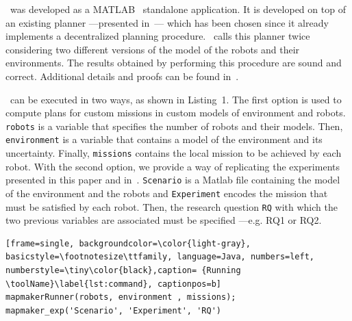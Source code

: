 
\toolName\  was developed as a  MATLAB~\cite{matlab} standalone application.
It is developed on top of an existing planner ---presented in~\cite{tumova2016multi}--- which has been chosen since it already implements a decentralized planning procedure.
\toolName\ calls this planner twice considering two different versions of the model of the robots and their environments. 
The results obtained by performing this procedure are sound and correct.
Additional details and proofs can be found in~\cite{menghi2018multi}.


\toolName\ can be executed in two ways, as shown in Listing~1.
The first option is used to compute plans for custom missions in custom models of environment and robots.
\texttt{robots} is a variable that specifies the number of robots and their models.
Then, \texttt{environment} is a variable that contains a model of the environment and its uncertainty.
Finally, \texttt{missions} contains the local mission to be achieved by each robot.
With the second option, we provide a way of replicating the experiments presented in this paper and in~\cite{menghi2018multi}.
\texttt{Scenario} is a Matlab file containing the model of the environment and the robots and \texttt{Experiment} encodes the mission that must be satisfied by each robot.
Then, the research question \texttt{RQ} with which the two previous variables are associated must be specified ---e.g. RQ1 or RQ2.



\begin{lstlisting}[frame=single, backgroundcolor=\color{light-gray}, basicstyle=\footnotesize\ttfamily, language=Java, numbers=left, numberstyle=\tiny\color{black},caption= {Running \toolName}\label{lst:command}, captionpos=b]
mapmakerRunner(robots, environment , missions);
mapmaker_exp('Scenario', 'Experiment', 'RQ')
\end{lstlisting}






